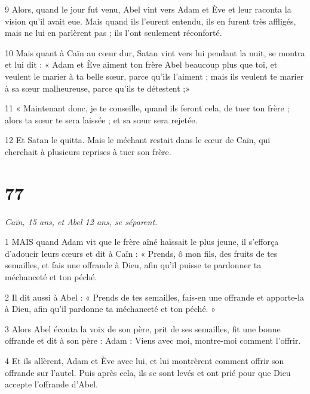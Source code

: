 \par 9 Alors, quand le jour fut venu, Abel vint vers Adam et Ève et leur raconta la vision qu'il avait eue. Mais quand ils l'eurent entendu, ils en furent très affligés, mais ne lui en parlèrent pas ; ils l'ont seulement réconforté.

\par 10 Mais quant à Caïn au cœur dur, Satan vint vers lui pendant la nuit, se montra et lui dit : « Adam et Ève aiment ton frère Abel beaucoup plus que toi, et veulent le marier à ta belle sœur, parce qu'ils l'aiment ; mais ils veulent te marier à sa sœur malheureuse, parce qu'ils te détestent ;»

\par 11 « Maintenant donc, je te conseille, quand ils feront cela, de tuer ton frère ; alors ta sœur te sera laissée ; et sa sœur sera rejetée.

\par 12 Et Satan le quitta. Mais le méchant restait dans le cœur de Caïn, qui cherchait à plusieurs reprises à tuer son frère.



\chapter{77}

\par \textit{Caïn, 15 ans, et Abel 12 ans, se séparent.}

\par 1 MAIS quand Adam vit que le frère aîné haïssait le plus jeune, il s'efforça d'adoucir leurs cœurs et dit à Caïn : « Prends, ô mon fils, des fruits de tes semailles, et fais une offrande à Dieu, afin qu'il puisse te pardonner ta méchanceté et ton péché.

\par 2 Il dit aussi à Abel : « Prends de tes semailles, fais-en une offrande et apporte-la à Dieu, afin qu'il pardonne ta méchanceté et ton péché. »

\par 3 Alors Abel écouta la voix de son père, prit de ses semailles, fit une bonne offrande et dit à son père : Adam : Viens avec moi, montre-moi comment l'offrir.

\par 4 Et ils allèrent, Adam et Ève avec lui, et lui montrèrent comment offrir son offrande sur l'autel. Puis après cela, ils se sont levés et ont prié pour que Dieu accepte l'offrande d'Abel.

